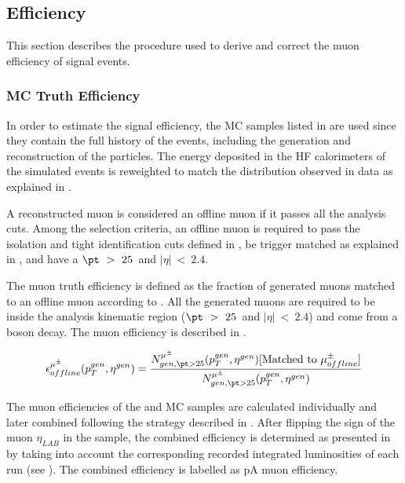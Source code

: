 \subsection{Efficiency}\label{sec:WBoson_Analysis_Efficiency}

This section describes the procedure used to derive and correct the muon efficiency of \WToMuNu signal events.

\subsubsection{MC Truth Efficiency}\label{sec:WBoson_Analysis_MCTruthEfficiency}

In order to estimate the signal efficiency, the \WToMuNu MC samples listed in  are used since they contain the full history of the events, including the generation and reconstruction of the particles. The energy deposited in the HF calorimeters of the simulated events is reweighted to match the distribution observed in data as explained in .

A reconstructed muon is considered an offline muon if it passes all the \W analysis cuts. Among the selection criteria, an offline muon is required to pass the isolation and tight identification cuts defined in , be trigger matched as explained in , and have a $\pt~>~25$~\GeVc and $|\eta|~<~2.4$.

The muon truth efficiency is defined as the fraction of generated muons matched to an offline muon according to .  All the generated muons are required to be inside the analysis kinematic region ($\pt~>~25$~\GeVc and $|\eta|~<~2.4$) and come from a \W boson decay. The muon efficiency is described in .

\begin{equation}
\epsilon^{\mu^{\pm}}_{offline}(p_{T}^{gen} , \eta^{gen}) = \frac{N_{gen,\pt>25}^{\mu^{\pm}}(p_{T}^{gen} , \eta^{gen})[\textnormal{Matched to }\mu_{offline}^{\pm}]}{N_{gen,\pt>25}^{\mu^{\pm}}(p_{T}^{gen} , \eta^{gen})}
\label{eq:MCTruthEfficiency}
\end{equation}

The muon efficiencies of the \pPb and \Pbp MC samples are calculated individually and later combined following the strategy described in . After flipping the sign of the muon $\eta_{LAB}$ in the \Pbp sample, the combined efficiency is determined as presented in  by taking into account the corresponding recorded integrated luminosities of each run (see ). The combined efficiency is labelled as pA muon efficiency.

